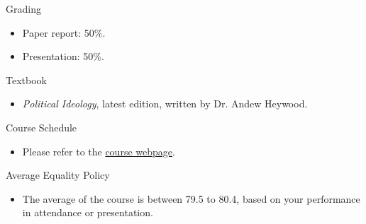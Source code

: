 \documentclass{article}
\begin{document}
\newpage
\begin{flushleft}
Grading \\
\end{flushleft}
\begin{itemize}
\item Paper report: 50\%. \\
\item Presentation: 50\%. \\
\end{itemize}
Textbook \\
\begin{itemize}
\item \textit{Political Ideology}, latest edition, written by Dr. Andew Heywood. \\
\end{itemize}
Course Schedule \\
\begin{itemize}
\item Please refer to the \href{https://politics-tchsiao.github.io/political_ideology/}{course webpage}. \\
\end{itemize}
Average Equality Policy \\
\begin{itemize}
\item The average of the course is between 79.5 to 80.4, based on your performance in attendance or presentation. \\
\end{itemize}
\end{document}
